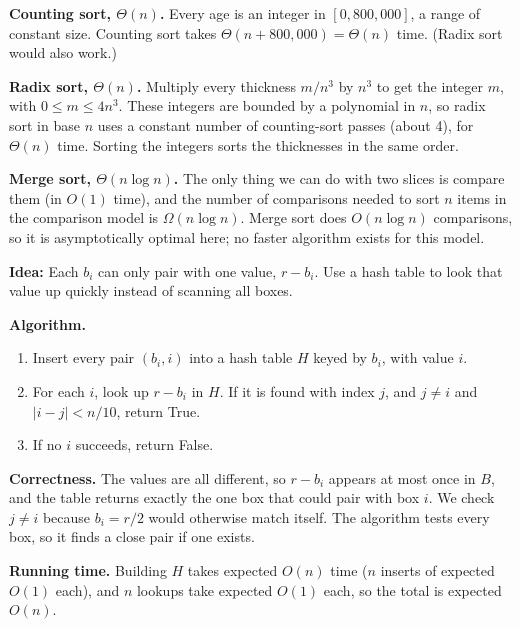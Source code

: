 \documentclass[12pt,twoside]{article}
\begin{document}
\begin{problems}
\begin{problemparts}
\problempart %
\textbf{Counting sort, $\Theta(n)$.} Every age is an integer in $[0,800{,}000]$, a range of constant
size. Counting sort takes $\Theta(n+800{,}000)=\Theta(n)$ time. (Radix sort would also work.)

\problempart %
\textbf{Radix sort, $\Theta(n)$.} Multiply every thickness $m/n^3$ by $n^3$ to get the integer $m$,
with $0\le m\le 4n^3$. These integers are bounded by a polynomial in $n$, so radix sort in base
$n$ uses a constant number of counting-sort passes (about 4), for $\Theta(n)$ time. Sorting the
integers sorts the thicknesses in the same order.

\problempart %
\textbf{Merge sort, $\Theta(n\log n)$.} The only thing we can do with two slices is compare them
(in $O(1)$ time), and the number of comparisons needed to sort $n$ items in the comparison model is
$\Omega(n\log n)$. Merge sort does $O(n\log n)$ comparisons, so it is asymptotically optimal here;
no faster algorithm exists for this model.
\end{problemparts}

\newpage

\problem  %

\begin{problemparts}
\problempart %
\textbf{Idea:} Each $b_i$ can only pair with one value, $r-b_i$. Use a hash table to look that
value up quickly instead of scanning all boxes.

\textbf{Algorithm.}
\begin{enumerate}
\item Insert every pair $(b_i, i)$ into a hash table $H$ keyed by $b_i$, with value $i$.
\item For each $i$, look up $r-b_i$ in $H$. If it is found with index $j$, and $j\ne i$ and
$|i-j|<n/10$, return True.
\item If no $i$ succeeds, return False.
\end{enumerate}

\textbf{Correctness.} The values are all different, so $r-b_i$ appears at most once in $B$, and the
table returns exactly the one box that could pair with box $i$. We check $j\ne i$ because $b_i=r/2$
would otherwise match itself. The algorithm tests every box, so it finds a close pair if one exists.

\textbf{Running time.} Building $H$ takes expected $O(n)$ time ($n$ inserts of expected $O(1)$ each),
and $n$ lookups take expected $O(1)$ each, so the total is expected $O(n)$.


\end{problemparts}
\end{problems}
\end{document}
